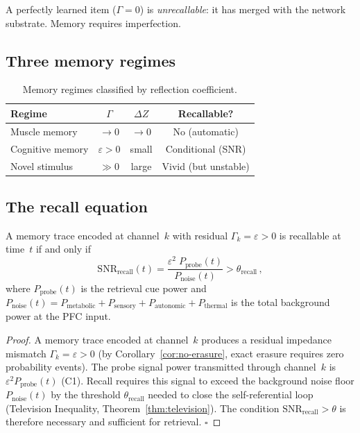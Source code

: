 \documentclass[aps,pre,twocolumn,superscriptaddress,floatfix]{revtex4-2}
\begin{document}
\begin{remark}
A perfectly learned item ($\Gamma=0$) is \emph{unrecallable}:
it has merged with the network substrate.
Memory requires imperfection.
\end{remark}

\subsection{Three memory regimes}

\begin{table}[h]
\centering
\caption{Memory regimes classified by reflection coefficient.}
\label{tab:memory-regimes}
\begin{tabular}{@{}lccc@{}}
\toprule
Regime & $\Gamma$ & $\Delta Z$ & Recallable? \\
\midrule
Muscle memory & $\to 0$ & $\to 0$ & No (automatic) \\
Cognitive memory & $\varepsilon>0$ & small & Conditional (SNR) \\
Novel stimulus & $\gg 0$ & large & Vivid (but unstable) \\
\bottomrule
\end{tabular}
\end{table}

\subsection{The recall equation}
\label{sec:recall-snr}

\begin{theorem}
\label{thm:recall-snr}
A memory trace encoded at channel~$k$ with residual
$\Gamma_k = \varepsilon > 0$ is recallable at time~$t$
if and only if
\begin{equation}
  \mathrm{SNR}_{\text{recall}}(t)
  = \frac{\varepsilon^2\;P_{\text{probe}}(t)}
         {P_{\text{noise}}(t)}
  > \theta_{\text{recall}}\,,
  \label{eq:recall-snr}
\end{equation}
where $P_{\text{probe}}(t)$ is the retrieval cue power and
$P_{\text{noise}}(t) = P_{\text{metabolic}} +
P_{\text{sensory}} + P_{\text{autonomic}} +
P_{\text{thermal}}$ is the total background power at the
PFC input.
\end{theorem}

\begin{proof}
A memory trace encoded at channel~$k$ produces a
residual impedance mismatch $\Gamma_k = \varepsilon > 0$
(by Corollary~\ref{cor:no-erasure}, exact erasure
requires zero probability events).
The probe signal power transmitted through channel~$k$
is $\varepsilon^2 P_{\text{probe}}(t)$ (C1).
Recall requires this signal to exceed the background
noise floor $P_{\text{noise}}(t)$ by the threshold
$\theta_{\text{recall}}$ needed to close the
self-referential loop (Television Inequality,
Theorem~\ref{thm:television}).
The condition $\mathrm{SNR}_{\text{recall}} > \theta$
is therefore necessary and sufficient for retrieval.
$\square$
\end{proof}
\end{document}
